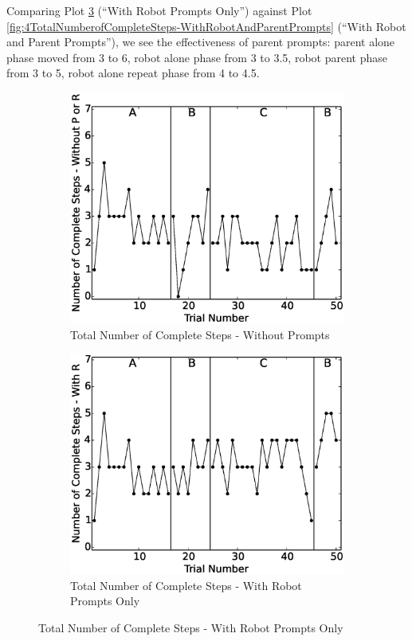 \documentclass{ut-thesis}
\begin{document}
Comparing Plot \ref{fig:6TotalNumberofCompleteSteps-WithRobotPrompts} (``With Robot Prompts Only'') against Plot \ref{fig:4TotalNumberofCompleteSteps-WithRobotAndParentPrompts} (``With Robot and Parent Prompts''), we see the effectiveness of parent prompts: parent alone phase moved from 3 to 6, robot alone phase from 3 to 3.5, robot parent phase from 3 to 5, robot alone repeat phase from 4 to 4.5.
\begin{figure}[h]
	\centering
	\begin{subfigure}[b]{0.49\textwidth}
		\includegraphics[width=1.1\linewidth]{./img/data_analysis/110NumberofCompleteSteps-WithoutPorR.eps}
		\caption{Total Number of Complete Steps - Without Prompts}
		\label{fig:7TotalNumberofCompleteSteps-WithoutPrompts}
	\end{subfigure}
	\hfill
	\begin{subfigure}[b]{0.49\textwidth}
		\includegraphics[width=1.1\linewidth]{./img/data_analysis/109NumberofCompleteSteps-WithR.eps}
		\caption{Total Number of Complete Steps - With Robot Prompts Only}
		\label{fig:6TotalNumberofCompleteSteps-WithRobotPrompts}
	\end{subfigure}%


\end{figure}
\end{document}
